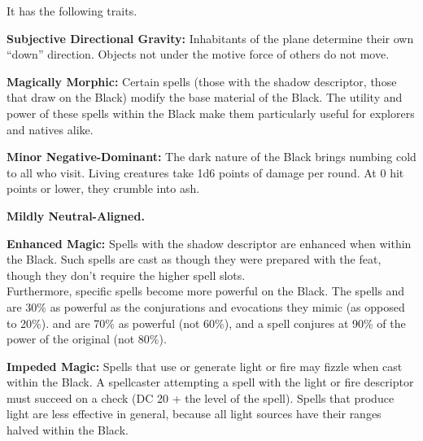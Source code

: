It has the following traits.
\begin{itemize*}
\item \textbf{Subjective Directional Gravity:} Inhabitants of the plane determine their own ``down'' direction. Objects not under the motive force of others do not move.
\item \textbf{Magically Morphic:} Certain spells (those with the shadow descriptor, those that draw on the Black) modify the base material of the Black. The utility and power of these spells within the Black make them particularly useful for explorers and natives alike.
\item \textbf{Minor Negative-Dominant:} The dark nature of the Black brings numbing cold to all who visit. Living creatures take 1d6 points of damage per round. At 0 hit points or lower, they crumble into ash.
\item \textbf{Mildly Neutral-Aligned.}
\item \textbf{Enhanced Magic:} Spells with the shadow descriptor are enhanced when within the Black. Such spells are cast as though they were prepared with the  feat, though they don't require the higher spell slots.\\

Furthermore, specific spells become more powerful on the Black. The spells  and  are 30\% as powerful as the conjurations and evocations they mimic (as opposed to 20\%).  and  are 70\% as powerful (not 60\%), and a  spell conjures at 90\% of the power of the original (not 80\%).

\item \textbf{Impeded Magic:} Spells that use or generate light or fire may fizzle when cast within the Black. A spellcaster attempting a spell with the light or fire descriptor must succeed on a  check (DC 20 + the level of the spell). Spells that produce light are less effective in general, because all light sources have their ranges halved within the Black.
\end{itemize*}
